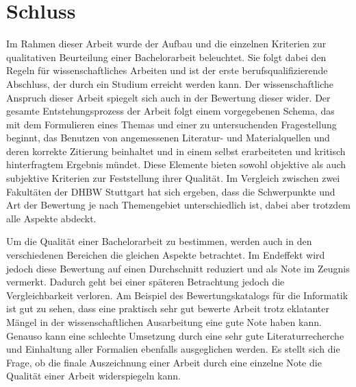 
 
\chapter{Schluss}
Im Rahmen dieser Arbeit wurde der Aufbau und die einzelnen Kriterien zur qualitativen Beurteilung einer Bachelorarbeit beleuchtet. Sie folgt dabei den Regeln für wissenschaftliches Arbeiten und ist der erste berufsqualifizierende Abschluss, der durch ein Studium erreicht werden kann.
Der wissenschaftliche Anspruch dieser Arbeit spiegelt sich auch in der Bewertung dieser wider. Der gesamte Entstehungsprozess der Arbeit folgt einem vorgegebenen Schema, das mit dem Formulieren eines Themas und einer zu untersuchenden Fragestellung beginnt, das Benutzen von angemessenen Literatur- und Materialquellen und deren korrekte Zitierung beinhaltet und in einem selbst erarbeiteten und kritisch hinterfragtem Ergebnis mündet. Diese Elemente bieten sowohl objektive als auch subjektive Kriterien zur Feststellung ihrer Qualität. Im Vergleich zwischen zwei Fakultäten der \ac{DHBW} Stuttgart hat sich ergeben, dass die Schwerpunkte und Art der Bewertung je nach Themengebiet unterschiedlich ist, dabei aber trotzdem alle Aspekte abdeckt. 

Um die Qualität einer Bachelorarbeit zu bestimmen, werden auch in den verschiedenen Bereichen die gleichen Aspekte betrachtet. Im Endeffekt wird jedoch diese Bewertung auf einen Durchschnitt reduziert und als Note im Zeugnis vermerkt. Dadurch geht bei einer späteren Betrachtung jedoch die Vergleichbarkeit verloren. Am Beispiel des Bewertungskatalogs für die Informatik ist gut zu sehen, dass eine praktisch sehr gut bewerte Arbeit trotz eklatanter Mängel in der wissenschaftlichen Ausarbeitung eine gute Note haben kann. Genauso kann eine schlechte Umsetzung durch eine sehr gute Literaturrecherche und Einhaltung aller Formalien ebenfalls ausgeglichen werden. Es stellt sich die Frage, ob die finale Auszeichnung einer Arbeit durch eine einzelne Note die Qualität einer Arbeit widerspiegeln kann. 
 
